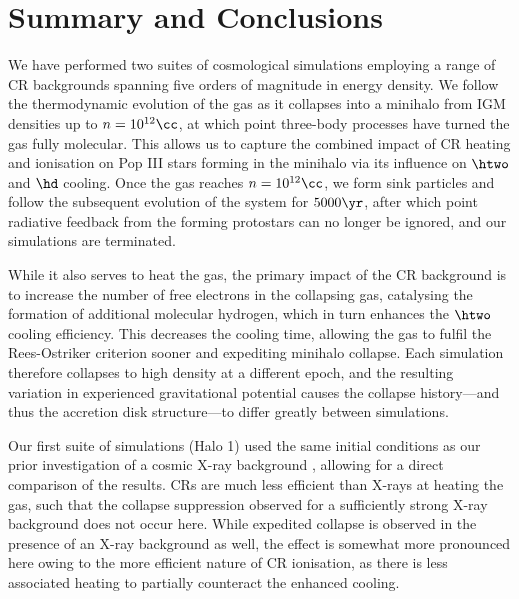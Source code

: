 \section{Summary and Conclusions}
\label{conclusions}

We have performed two suites of cosmological simulations employing a range of CR backgrounds spanning five orders of magnitude in energy density. 
We follow the thermodynamic evolution of the gas as it collapses into a minihalo from IGM densities up to $n=10^{12}\cc$, at which point three-body processes have turned the gas fully molecular. 
This allows us to capture the combined impact of CR heating and ionisation on Pop III stars forming in the minihalo via its influence on $\htwo$ and $\hd$ cooling.
Once the gas reaches $n=10^{12}\cc$, we form sink particles and follow the subsequent evolution of the system for $5000\yr$, after which point radiative feedback from the forming protostars can no longer be ignored, and our simulations are terminated.

While it also serves to heat the gas, the primary impact of the CR background is to increase the number of free electrons in the collapsing gas, catalysing the formation of additional molecular hydrogen, which in turn enhances the $\htwo$ cooling efficiency.  
This decreases the cooling time, allowing the gas to fulfil the Rees-Ostriker criterion sooner and expediting minihalo collapse. 
Each simulation therefore collapses to high density at a different epoch, and the resulting variation in experienced gravitational potential causes the collapse history---and thus the accretion disk structure---to differ greatly between simulations.

Our first suite of simulations (Halo 1) used the same initial conditions as our prior investigation of a cosmic X-ray background \citep{Hummeletal2015}, allowing for a direct comparison of the results.
CRs are much less efficient than X-rays at heating the gas, such that the collapse suppression observed for a sufficiently strong X-ray background does not occur here.  
While expedited collapse is observed in the presence of an X-ray background as well, the effect is somewhat more pronounced here owing to the more efficient nature of CR ionisation, as there is less associated heating to partially counteract the enhanced cooling.

